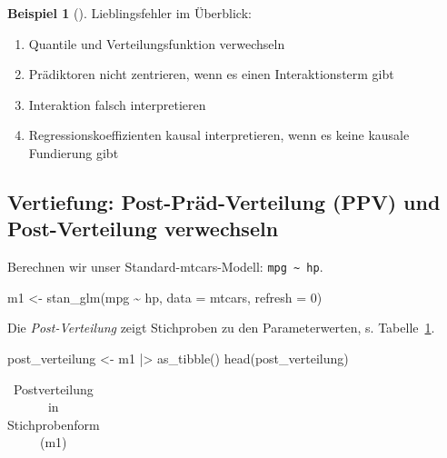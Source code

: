 \documentclass[
  ngerman,
  letterpaper,
  twoside,
  open=any]{scrbook}
\newenvironment{Shaded}{\begin{snugshade}}{\end{snugshade}}
\newcommand{\AttributeTok}[1]{\textcolor[rgb]{0.40,0.45,0.13}{#1}}
\newcommand{\DecValTok}[1]{\textcolor[rgb]{0.68,0.00,0.00}{#1}}
\newcommand{\FunctionTok}[1]{\textcolor[rgb]{0.28,0.35,0.67}{#1}}
\newcommand{\NormalTok}[1]{\textcolor[rgb]{0.00,0.23,0.31}{#1}}
\newcommand{\OtherTok}[1]{\textcolor[rgb]{0.00,0.23,0.31}{#1}}
\newcommand{\SpecialCharTok}[1]{\textcolor[rgb]{0.37,0.37,0.37}{#1}}
\providecommand{\tightlist}{%
  \setlength{\itemsep}{0pt}\setlength{\parskip}{0pt}}\usepackage{longtable,booktabs,array}
\theoremstyle{definition}
\newtheorem{example}{Beispiel}[chapter]
\theoremstyle{plain}
\theoremstyle{definition}
\theoremstyle{definition}
\theoremstyle{remark}
\begin{document}
\begin{example}[]
Lieblingsfehler im Überblick:

\begin{enumerate}
\def\labelenumi{\arabic{enumi}.}
\tightlist
\item
  Quantile und Verteilungsfunktion verwechseln
\item
  Prädiktoren nicht zentrieren, wenn es einen Interaktionsterm gibt
\item
  Interaktion falsch interpretieren
\item
  Regressionskoeffizienten kausal interpretieren, wenn es keine kausale
  Fundierung gibt
\end{enumerate}

\subsection{Vertiefung: Post-Präd-Verteilung (PPV) und Post-Verteilung
verwechseln}\label{vertiefung-post-pruxe4d-verteilung-ppv-und-post-verteilung-verwechseln}

Berechnen wir unser Standard-mtcars-Modell:
\texttt{mpg\ \textasciitilde{}\ hp}.

\begin{Shaded}
\begin{Highlighting}[]
\NormalTok{m1 }\OtherTok{\textless{}{-}} \FunctionTok{stan\_glm}\NormalTok{(mpg }\SpecialCharTok{\textasciitilde{}}\NormalTok{ hp, }\AttributeTok{data =}\NormalTok{ mtcars, }\AttributeTok{refresh =} \DecValTok{0}\NormalTok{)}
\end{Highlighting}
\end{Shaded}

Die \emph{Post-Verteilung} zeigt Stichproben zu den Parameterwerten, s.
Tabelle~\ref{tbl-post-m1}.

\begin{Shaded}
\begin{Highlighting}[]
\NormalTok{post\_verteilung }\OtherTok{\textless{}{-}}\NormalTok{ m1 }\SpecialCharTok{|\textgreater{}} 
  \FunctionTok{as\_tibble}\NormalTok{()}
\FunctionTok{head}\NormalTok{(post\_verteilung)}
\end{Highlighting}
\end{Shaded}

{

\begin{longtable}[]{@{}rrr@{}}

\caption{\label{tbl-post-m1}Postverteilung in Stichprobenform (m1)}

\tabularnewline


\end{longtable}}
\end{example}
\end{document}

